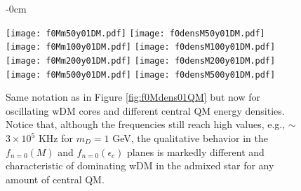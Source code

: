 \documentclass[universe,article,accept,moreauthors,pdftex]{Definitions/mdpi}
\begin{document}
\begin{figure}[H]\ContinuedFloat


\begin{adjustwidth}{-\extralength}{0cm}
\centering %

{\texttt{[image: f0Mm50y01DM.pdf]}\vspace{1pt}
	  \texttt{[image: f0densM50y01DM.pdf]}}\\\vspace{5pt}
{\texttt{[image: f0Mm100y01DM.pdf]}\vspace{3pt}
	  \texttt{[image: f0densM100y01DM.pdf]}}\\\vspace{5pt}
{\texttt{[image: f0Mm200y01DM.pdf]}\vspace{3pt}
	  \texttt{[image: f0densM200y01DM.pdf]}}\\\vspace{5pt}
{\texttt{[image: f0Mm500y01DM.pdf]}\vspace{1pt}
	  \texttt{[image: f0densM500y01DM.pdf]}}
\end{adjustwidth}
\caption{Same notation as in Figure \ref{fig:f0Mdens01QM} but now for oscillating wDM cores and different central QM energy densities. Notice that, although the frequencies still reach high values, e.g., $\sim$$3\times{10}^{5}$ KHz for $m_{D}=1$ GeV, the qualitative behavior in the $f_{n=0}(M)$ and $f_{n=0}(\epsilon_{c})$ planes is markedly different and characteristic of dominating wDM in the admixed star for any amount of central QM.}
\label{fig:f0Mdens01DM}%

\end{figure}
\end{document}
